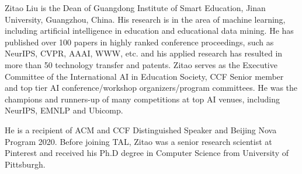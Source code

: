 Zitao Liu is the Dean of Guangdong Institute of Smart Education, Jinan University, Guangzhou, China. His research is in the area of machine learning, including artificial intelligence in education and educational data mining. He has published over 100 papers in highly ranked conference proceedings, such as NeurIPS, CVPR, AAAI, WWW, etc. and his applied research has resulted in more than 50 technology transfer and patents. Zitao serves as the Executive Committee of the International AI in Education Society, CCF Senior member and top tier AI conference/workshop organizers/program committees. He was the champions and runners-up of many competitions at top AI venues, including NeurIPS, EMNLP and Ubicomp.

He is a recipient of ACM and CCF Distinguished Speaker and Beijing Nova Program 2020. Before joining TAL, Zitao was a senior research scientist at Pinterest and received his Ph.D degree in Computer Science from University of Pittsburgh.
